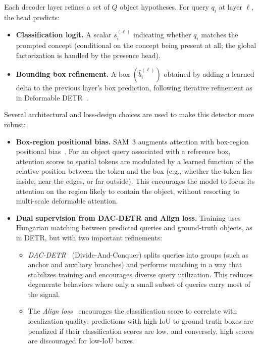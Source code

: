 \begin{enrichment}
\begin{enrichment}
		Each decoder layer refines a set of $Q$ object hypotheses. For query $q_i$ at layer $\ell$, the head predicts:
		\begin{itemize}
			\item \textbf{Classification logit.} A scalar $s_i^{(\ell)}$ indicating whether $q_i$ matches the prompted concept (conditional on the concept being present at all; the global factorization is handled by the presence head).
			\item \textbf{Bounding box refinement.} A box $(\hat{b}_i^{(\ell)})$ obtained by adding a learned delta to the previous layer’s box prediction, following iterative refinement as in Deformable DETR~\cite{zhu2021_deformabledetr}.
		\end{itemize}
		
		Several architectural and loss-design choices are used to make this detector more robust:
		\begin{itemize}
			\item \textbf{Box-region positional bias.}
			SAM~3 augments attention with box-region positional bias~\cite{lin2023_boxposbias}. For an object query associated with a reference box, attention scores to spatial tokens are modulated by a learned function of the relative position between the token and the box (e.g., whether the token lies inside, near the edges, or far outside). This encourages the model to focus its attention on the region likely to contain the object, without resorting to multi-scale deformable attention.
			
			\item \textbf{Dual supervision from DAC-DETR and Align loss.}
			Training uses Hungarian matching between predicted queries and ground-truth objects, as in DETR, but with two important refinements:
			\begin{itemize}
				\item \emph{DAC-DETR}~\cite{hu2023_dacdetr} (Divide-And-Conquer) splits queries into groups (such as anchor and auxiliary branches) and performs matching in a way that stabilizes training and encourages diverse query utilization. This reduces degenerate behaviors where only a small subset of queries carry most of the signal.
				\item The \emph{Align loss}~\cite{cai2024_align} encourages the classification score to correlate with localization quality: predictions with high IoU to ground-truth boxes are penalized if their classification scores are low, and conversely, high scores are discouraged for low-IoU boxes.
				

\end{itemize}
\end{itemize}
\end{enrichment}
\end{enrichment}
